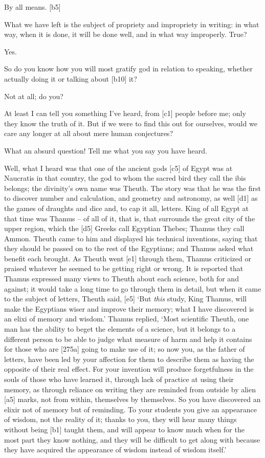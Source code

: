  By all means. {[}b5{]}

 What we have left is the subject of propriety and impropriety
in writing: in what way,
when it is done, it will be done well, and in what way improperly. True?

 Yes.

 So do you know how you will most gratify god in relation to
speaking, whether actually doing it or talking about {[}b10{]} it?

 Not at all; do you?

 At least I can tell you something I've heard, from {[}c1{]}
people before me; only they know the truth of it. But if we were to find
this out for ourselves, would we care any longer at all about mere human
conjectures?

 What an absurd question! Tell me what you say you have heard.

 Well, what I heard was that one of the ancient gods {[}c5{]} of
Egypt was at Naucratis in that country, the god to whom the sacred bird
they call the ibis belongs; the divinity's own name was Theuth. The
story was that he was the first to discover number and calculation, and
geometry and astronomy, as well {[}d1{]} as the games of draughts and
dice and, to cap it all, letters. King of all Egypt at that time was
Thamus -- of all of it, that is, that surrounds the great city of the
upper region, which the {[}d5{]} Greeks call Egyptian Thebes; Thamus
they call Ammon. Theuth came to him and displayed his technical
inventions, saying that they should be passed on to the rest of the
Egyptians; and Thamus asked what benefit each brought. As Theuth went
{[}e1{]} through them, Thamus criticized or praised whatever he seemed
to be getting right or wrong. It is reported that Thamus expressed many
views to Theuth about each science, both for and against; it would take
a long time to go through them in detail, but when it came to the
subject of letters, Theuth said, {[}e5{]} ‘But {\em this} study, King
Thamus, will make the Egyptians wiser and improve their memory; what I
have discovered is an
elixi of memory and
wisdom.' Thamus replied, ‘Most scientific Theuth, one man has the
ability to beget the elements of a science, but it belongs to a
different person to be able to judge what measure of harm and help it
contains for those who are {[}275a{]} going to make use of it; so now
you, as the father of letters, have been led by your affection for them
to describe them as having the opposite of their real effect. For your
invention will produce forgetfulness in the souls of those who have
learned it, through lack of practice at using their memory, as through
reliance on writing they are reminded from outside by alien {[}a5{]}
marks, not from within, themselves by
themselves. So you have
discovered an elixir not of memory but of reminding. To your students
you give an appearance of wisdom, not the reality of it; thanks to you,
they will hear many things without being {[}b1{]} taught them, and will
appear to know much when for the most part they know nothing, and they
will be difficult to get along with because they have acquired the
appearance of wisdom instead of wisdom itself.'

